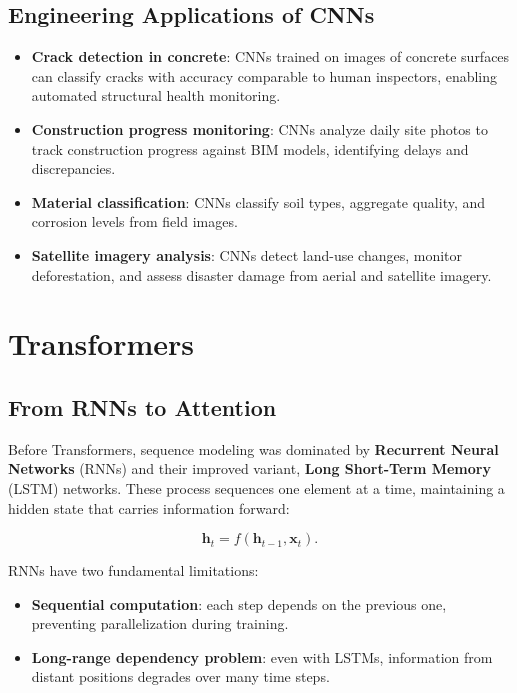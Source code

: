 \documentclass[12pt]{article}
\begin{document}
\subsection{Engineering Applications of CNNs}

\begin{itemize}
    \item \textbf{Crack detection in concrete}: CNNs trained on images of concrete surfaces can classify cracks with accuracy comparable to human inspectors, enabling automated structural health monitoring.
    \item \textbf{Construction progress monitoring}: CNNs analyze daily site photos to track construction progress against BIM models, identifying delays and discrepancies.
    \item \textbf{Material classification}: CNNs classify soil types, aggregate quality, and corrosion levels from field images.
    \item \textbf{Satellite imagery analysis}: CNNs detect land-use changes, monitor deforestation, and assess disaster damage from aerial and satellite imagery.
\end{itemize}

\section{Transformers}

\subsection{From RNNs to Attention}

Before Transformers, sequence modeling was dominated by \textbf{Recurrent Neural Networks} (RNNs) and their improved variant, \textbf{Long Short-Term Memory} (LSTM) networks. These process sequences one element at a time, maintaining a hidden state that carries information forward:

\begin{equation}
    \mathbf{h}_t = f(\mathbf{h}_{t-1}, \mathbf{x}_t).
    \label{t13eq:rnn}
\end{equation}

RNNs have two fundamental limitations:
\begin{itemize}
    \item \textbf{Sequential computation}: each step depends on the previous one, preventing parallelization during training.
    \item \textbf{Long-range dependency problem}: even with LSTMs, information from distant positions degrades over many time steps.
\end{itemize}
\end{document}
